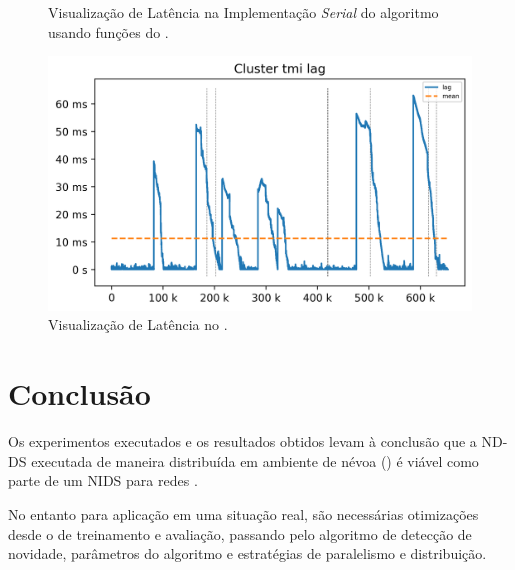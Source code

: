 \begin{figure}[htb]
\begin{minipage}{0.49\textwidth}
    \caption{Visualização de Latência na Implementação \emph{Serial} do algoritmo \minas usando funções do \mfog.}
    \label{fig:lag-serial}
  \end{minipage}
  \hfill
  \begin{minipage}{0.49\textwidth}
    \centering
    \includegraphics[width=1\linewidth]{experiments/lag-mfog.png}
    \caption{Visualização de Latência no \mfog.}
    \label{fig:lag-mfog}
  \end{minipage}
\end{figure}

\FloatBarrier
\section{Conclusão}
\label{sec:exp-conclusao}

Os experimentos executados e os resultados obtidos levam à conclusão que a
\acf{ND-DS} executada de maneira distribuída em ambiente de névoa (\fog) é
viável como parte de um \acf{NIDS} para redes \iot.


No entanto para aplicação em uma situação real, são necessárias otimizações
desde o \dataset de treinamento e avaliação, passando pelo algoritmo de detecção
de novidade, parâmetros do algoritmo e estratégias de paralelismo e
distribuição.
